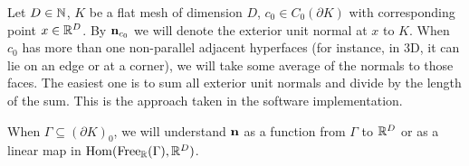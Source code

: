 \begin{notation}
  Let
    $D \in \mathbb{N}$,
    $K$ be a flat mesh of dimension $D$,
    $c_0 \in C_0(\partial K)$ with corresponding point $x \in \mathbb{R}^D$.
  By ${\bf n}_{c_0}$ we will denote the exterior unit normal at $x$ to $K$.
  When $c_{0}$ has more than one non-parallel adjacent hyperfaces
  (for instance, in $3$D, it can lie on an edge or at a corner), we will take
  some average of the normals to those faces.
  The easiest one is to sum all exterior unit normals and divide by the length
  of the sum.
  This is the approach taken in the software implementation.

  When $\Gamma \subseteq (\partial K)_0$, we will understand ${\bf n}$ as
  a function from $\Gamma$ to $\mathbb{R}^D$ or as a linear map in
  $\mathop{\rm Hom}\nolimits({\rm Free}_{\mathbb{R}}(\Gamma), \mathbb{R}^D)$.
\end{notation}
